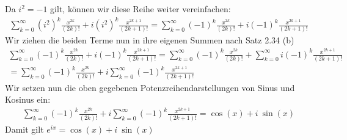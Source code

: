 \documentclass{article}
\begin{document}
\begin{enumerate}[label = (\alph*) ]
        Da \(i^2 = -1\) gilt, können wir diese Reihe weiter vereinfachen:
        \begin{gather*}
            \sum_{k=0}^{\infty} {(i^2)}^{k} \frac{ {x}^{2k}} {(2k)!} + i{(i^2)}^{k} \frac{ {x}^{2k+1} }{(2k+1)!} = \sum_{k=0}^{\infty} {(-1)}^{k} \frac{ {x}^{2k}} {(2k)!} + i{(-1)}^{k} \frac{ {x}^{2k+1} }{(2k+1)!}
        \end{gather*}
        Wir ziehen die beiden Terme nun in ihre eigenen Summen nach Satz 2.34 (b)
        \begin{gather*}
            \sum_{k=0}^{\infty} {(-1)}^{k} \frac{ {x}^{2k}} {(2k)!} + i{(-1)}^{k} \frac{ {x}^{2k+1} }{(2k+1)!} = \sum_{k=0}^{\infty} {(-1)}^{k} \frac{ {x}^{2k}} {(2k)!} + \sum_{k=0}^{\infty} i{(-1)}^{k} \frac{ {x}^{2k+1} }{(2k+1)!} \\
            = \sum_{k=0}^{\infty} {(-1)}^{k} \frac{ {x}^{2k}} {(2k)!} + i\sum_{k=0}^{\infty} {(-1)}^{k} \frac{ {x}^{2k+1} }{(2k+1)!}
        \end{gather*}
        Wir setzen nun die oben gegebenen Potenzreihendarstellungen von Sinus und Kosinus ein:
        \begin{gather*}
            \sum_{k=0}^{\infty} {(-1)}^{k} \frac{ {x}^{2k}} {(2k)!} + i\sum_{k=0}^{\infty} {(-1)}^{k} \frac{ {x}^{2k+1} }{(2k+1)!} = \cos(x) + i \ \sin(x)
        \end{gather*}
        Damit gilt \(e^{ix} = \cos(x) + i \ \sin(x)\)


\end{enumerate}
\end{document}
